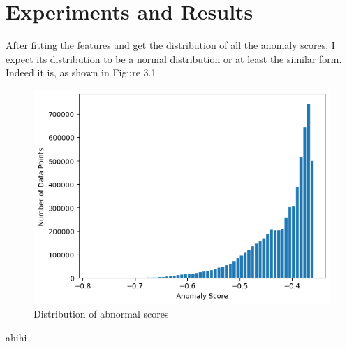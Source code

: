 \section{Experiments and Results}
\newpage

After fitting the features and get the distribution of all the anomaly scores, I expect its distribution to be a normal distribution or at least the similar form. Indeed it is, as shown in Figure 3.1

\begin{figure}
  \centering
  \includegraphics[width=\linewidth]{body/03_experiment_result/img/figure1.png}
  \caption{Distribution of abnormal scores}
\end{figure}


ahihi